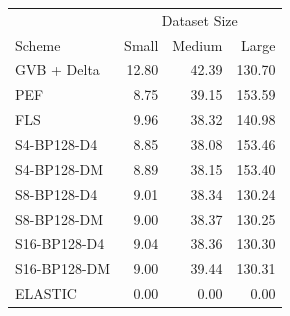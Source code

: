 \begin{tabular}{lrrr}
\toprule
 & \multicolumn{3}{c}{Dataset Size} \\
Scheme & Small & Medium & Large \\
\midrule
GVB + Delta & 12.80 & 42.39 & 130.70 \\
PEF & 8.75 & 39.15 & 153.59 \\
FLS & 9.96 & 38.32 & 140.98 \\
S4-BP128-D4 & 8.85 & 38.08 & 153.46 \\
S4-BP128-DM & 8.89 & 38.15 & 153.40 \\
S8-BP128-D4 & 9.01 & 38.34 & 130.24 \\
S8-BP128-DM & 9.00 & 38.37 & 130.25 \\
S16-BP128-D4 & 9.04 & 38.36 & 130.30 \\
S16-BP128-DM & 9.00 & 39.44 & 130.31 \\
ELASTIC & 0.00 & 0.00 & 0.00 \\
\bottomrule
\end{tabular}
